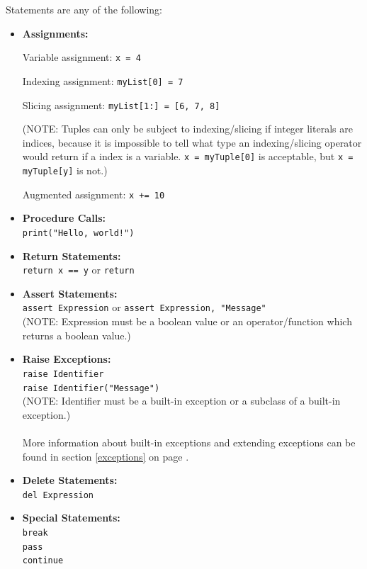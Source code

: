 \documentclass{article}
\begin{document}
Statements are any of the following:
\begin{itemize}
\item\textbf{Assignments:} 

Variable assignment: \verb|x = 4| 

Indexing assignment: \verb|myList[0] = 7| 

Slicing assignment: \verb|myList[1:] = [6, 7, 8]| 

(NOTE: Tuples can only be subject to indexing/slicing if integer literals are indices, because it is impossible to tell what type an indexing/slicing operator would return if a index is a variable. \verb|x = myTuple[0]| is acceptable, but \verb|x = myTuple[y]| is not.) 

Augmented assignment: \verb|x += 10| 

\item\textbf{Procedure Calls:} \\
\verb|print("Hello, world!")| 

\item\textbf{Return Statements:} \\
\verb|return x == y| or \verb|return| 

\item\textbf{Assert Statements:} \\
\verb|assert Expression| or \verb|assert Expression, "Message"| \\
(NOTE: Expression must be a boolean value or an operator/function which returns a boolean value.) 

\item\textbf{Raise Exceptions:} \\
\verb|raise Identifier| \\
\verb|raise Identifier("Message")| \\
(NOTE: Identifier must be a built-in exception or a subclass of a built-in exception.)\\ \\
More information about built-in exceptions and extending exceptions can be found in section \ref{exceptions} on page \pageref{exceptions}.

\item\textbf{Delete Statements:} \\
\verb|del Expression|

\item\textbf{Special Statements:} \\
\verb|break| \\
\verb|pass| \\
\verb|continue| 
\end{itemize}
\end{document}
